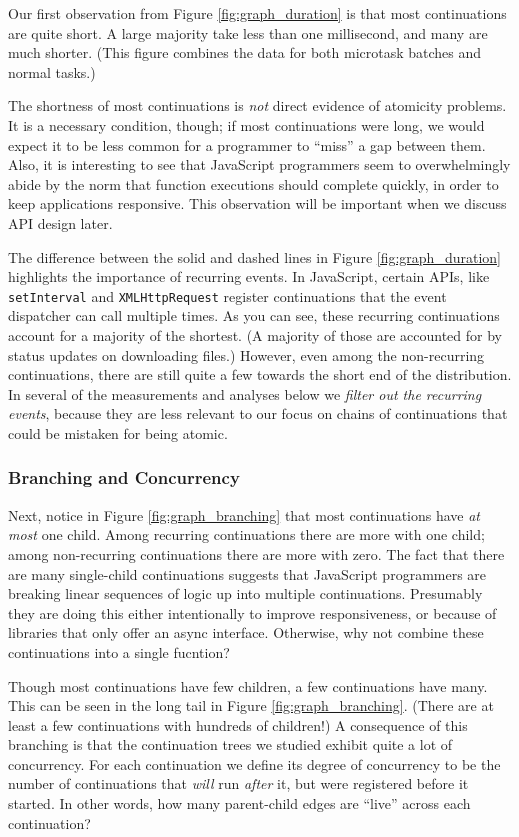 \documentclass[acmsmall,anonymous,review]{acmart}\settopmatter{printfolios=true,printccs=false,printacmref=false}
\begin{document}
Our first observation from Figure \ref{fig:graph_duration} is that most continuations are quite short.
A large majority take less than one millisecond, and many are much shorter.
(This figure combines the data for both microtask batches and normal tasks.)

The shortness of most continuations is \emph{not} direct evidence of atomicity problems.
It is a necessary condition, though; if most continuations were long, we would expect it to be less common for a programmer to ``miss'' a gap between them.
Also, it is interesting to see that JavaScript programmers seem to overwhelmingly abide by the norm that function executions should complete quickly, in order to keep applications responsive.
This observation will be important when we discuss API design later.

The difference between the solid and dashed lines in Figure \ref{fig:graph_duration} highlights the importance of recurring events.
In JavaScript, certain APIs, like \texttt{setInterval} and \texttt{XMLHttpRequest} register continuations that the event dispatcher can call multiple times.
As you can see, these recurring continuations account for a majority of the shortest.
(A majority of those are accounted for by status updates on downloading files.)
However, even among the non-recurring continuations, there are still quite a few towards the short end of the distribution.
In several of the measurements and analyses below we \emph{filter out the recurring events}, because they are less relevant to our focus on chains of continuations that could be mistaken for being atomic.

\subsubsection{Branching and Concurrency}

Next, notice in Figure \ref{fig:graph_branching} that most continuations have \emph{at most} one child.
Among recurring continuations there are more with one child; among non-recurring continuations there are more with zero.
The fact that there are many single-child continuations suggests that JavaScript programmers are breaking linear sequences of logic up into multiple continuations.
Presumably they are doing this either intentionally to improve responsiveness, or because of libraries that only offer an async interface.
Otherwise, why not combine these continuations into a single fucntion?

Though most continuations have few children, a few continuations have many.
This can be seen in the long tail in Figure \ref{fig:graph_branching}.
(There are at least a few continuations with hundreds of children!)
A consequence of this branching is that the continuation trees we studied exhibit quite a lot of concurrency.
For each continuation we define its degree of concurrency to be the number of continuations that \emph{will} run \emph{after} it, but were registered before it started.
In other words, how many parent-child edges are ``live'' across each continuation?
\end{document}
